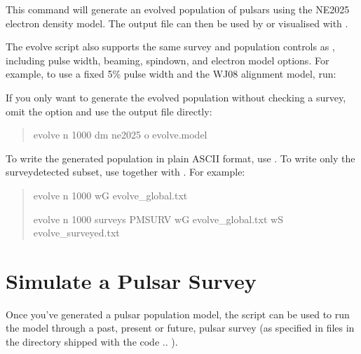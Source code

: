 \documentclass[letterpaper,10pt,english]{sphinxmanual}
\begin{document}
\sphinxAtStartPar
This command will generate an evolved population of pulsars
using the NE2025 electron density model. The output file
 can then be used by  or visualised with
.

\sphinxAtStartPar
The evolve script also supports the same survey and population controls as
, including pulse width, beaming, spin\sphinxhyphen{}down, and electron
model options. For example, to use a fixed 5\% pulse width and the WJ08
alignment model, run:

\begin{sphinxVerbatim}[commandchars=\\\{\}]
          
\end{sphinxVerbatim}

\sphinxAtStartPar
If you only want to generate the evolved population without checking a
survey, omit the  option and use the output file directly:
\begin{quote}

\sphinxAtStartPar
evolve \sphinxhyphen{}n 1000 \sphinxhyphen{}dm ne2025 \sphinxhyphen{}o evolve.model
\end{quote}

\sphinxAtStartPar
To write the generated population in plain ASCII format, use .
To write only the survey\sphinxhyphen{}detected subset, use  together with
. For example:
\begin{quote}

\sphinxAtStartPar
evolve \sphinxhyphen{}n 1000 \sphinxhyphen{}wG evolve\_global.txt

\sphinxAtStartPar
evolve \sphinxhyphen{}n 1000 \sphinxhyphen{}surveys PMSURV \sphinxhyphen{}wG evolve\_global.txt \sphinxhyphen{}wS evolve\_surveyed.txt
\end{quote}


\section{Simulate a Pulsar Survey}
\label{\detokenize{tutorial-basic:simulate-a-pulsar-survey}}\label{\detokenize{tutorial-basic:simulate-survey}}
\sphinxAtStartPar
Once you’ve generated a pulsar population model, the  script
can be used to run the model through a past, present or future, pulsar
survey (as specified in files in the  directory shipped with the code
.. ).
\end{document}
